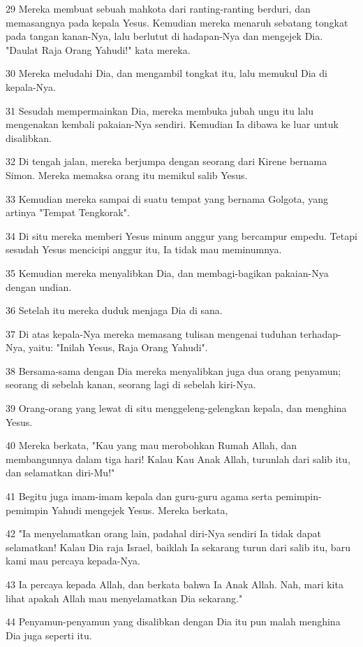 \par 29 Mereka membuat sebuah mahkota dari ranting-ranting berduri, dan memasangnya pada kepala Yesus. Kemudian mereka menaruh sebatang tongkat pada tangan kanan-Nya, lalu berlutut di hadapan-Nya dan mengejek Dia. "Daulat Raja Orang Yahudi!" kata mereka.
\par 30 Mereka meludahi Dia, dan mengambil tongkat itu, lalu memukul Dia di kepala-Nya.
\par 31 Sesudah mempermainkan Dia, mereka membuka jubah ungu itu lalu mengenakan kembali pakaian-Nya sendiri. Kemudian Ia dibawa ke luar untuk disalibkan.
\par 32 Di tengah jalan, mereka berjumpa dengan seorang dari Kirene bernama Simon. Mereka memaksa orang itu memikul salib Yesus.
\par 33 Kemudian mereka sampai di suatu tempat yang bernama Golgota, yang artinya "Tempat Tengkorak".
\par 34 Di situ mereka memberi Yesus minum anggur yang bercampur empedu. Tetapi sesudah Yesus mencicipi anggur itu, Ia tidak mau meminumnya.
\par 35 Kemudian mereka menyalibkan Dia, dan membagi-bagikan pakaian-Nya dengan undian.
\par 36 Setelah itu mereka duduk menjaga Dia di sana.
\par 37 Di atas kepala-Nya mereka memasang tulisan mengenai tuduhan terhadap-Nya, yaitu: "Inilah Yesus, Raja Orang Yahudi".
\par 38 Bersama-sama dengan Dia mereka menyalibkan juga dua orang penyamun; seorang di sebelah kanan, seorang lagi di sebelah kiri-Nya.
\par 39 Orang-orang yang lewat di situ menggeleng-gelengkan kepala, dan menghina Yesus.
\par 40 Mereka berkata, "Kau yang mau merobohkan Rumah Allah, dan membangunnya dalam tiga hari! Kalau Kau Anak Allah, turunlah dari salib itu, dan selamatkan diri-Mu!"
\par 41 Begitu juga imam-imam kepala dan guru-guru agama serta pemimpin-pemimpin Yahudi mengejek Yesus. Mereka berkata,
\par 42 "Ia menyelamatkan orang lain, padahal diri-Nya sendiri Ia tidak dapat selamatkan! Kalau Dia raja Israel, baiklah Ia sekarang turun dari salib itu, baru kami mau percaya kepada-Nya.
\par 43 Ia percaya kepada Allah, dan berkata bahwa Ia Anak Allah. Nah, mari kita lihat apakah Allah mau menyelamatkan Dia sekarang."
\par 44 Penyamun-penyamun yang disalibkan dengan Dia itu pun malah menghina Dia juga seperti itu.
